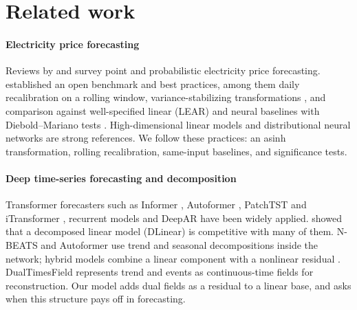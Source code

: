 \documentclass[preprint,12pt]{elsarticle}
\begin{document}
\section{Related work}
\label{sec:related}

\paragraph{Electricity price forecasting} Reviews by \citet{weron2014electricity} and \citet{nowotarski2018recent} survey point and probabilistic electricity price forecasting. \citet{lago2021forecasting} established an open benchmark and best practices, among them daily recalibration on a rolling window, variance-stabilizing transformations \citep{uniejewski2018variance}, and comparison against well-specified linear (LEAR) and neural baselines with Diebold--Mariano tests \citep{diebold1995comparing}. High-dimensional linear models \citep{ziel2018day} and distributional neural networks \citep{marcjasz2023distributional} are strong references. We follow these practices: an asinh transformation, rolling recalibration, same-input baselines, and significance tests.

\paragraph{Deep time-series forecasting and decomposition} Transformer forecasters such as Informer \citep{zhou2021informer}, Autoformer \citep{wu2021autoformer}, PatchTST \citep{nie2023time} and iTransformer \citep{liu2024itransformer}, recurrent models \citep{hochreiter1997long,cho2014learning} and DeepAR \citep{salinas2020deepar} have been widely applied. \citet{zeng2023transformers} showed that a decomposed linear model (DLinear) is competitive with many of them. N-BEATS \citep{oreshkin2020nbeats} and Autoformer use trend and seasonal decompositions inside the network; hybrid models combine a linear component with a nonlinear residual \citep{zhang2003time}. DualTimesField \citep{zhang2026dualtimesfield} represents trend and events as continuous-time fields for reconstruction. Our model adds dual fields as a residual to a linear base, and asks when this structure pays off in forecasting.
\end{document}
